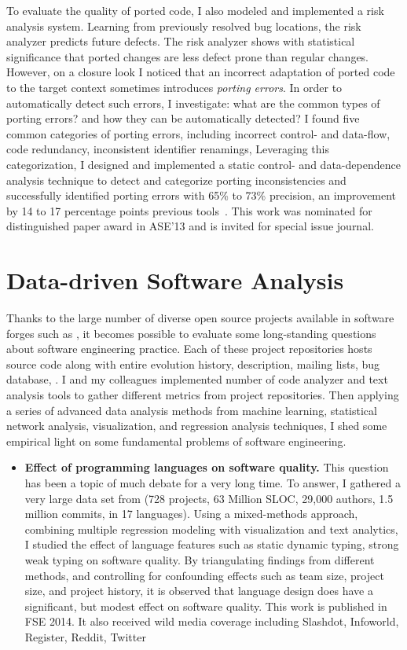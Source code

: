 \documentclass[a4paper, 11pt]{article}
\begin{document}
\begin{small}
To evaluate the quality of ported code, I also modeled and implemented a risk analysis system.
Learning from previously resolved bug locations, the risk analyzer predicts future defects. The
risk analyzer shows with statistical significance that ported changes are less defect prone
than regular changes. However, on a closure look I noticed that an incorrect adaptation of
ported code to the target context sometimes introduces {\em porting errors}. In order to
automatically detect such errors, I investigate: what are the common types of porting errors?
and how they can be automatically detected? I found five common categories of porting errors,
including incorrect control- and data-flow, code redundancy, inconsistent identifier renamings,
\etc Leveraging this categorization, I designed and implemented a static control- and
data-dependence analysis technique to detect and categorize porting inconsistencies and
successfully identified porting errors with 65\% to 73\% precision, an improvement by 14 to 17
percentage points \wrt previous tools~\cite{}. This work was nominated for distinguished paper
award in ASE'13 and is invited for special issue journal.

\section*{\large Data-driven Software Analysis}

Thanks to the large number of diverse open source projects available in software forges such as
\gh, it becomes possible to evaluate some long-standing questions about software engineering
practice. Each of these project repositories hosts source code along with entire evolution
history, description, mailing lists, bug database, \etc.  I and my colleagues implemented
number of code analyzer and text analysis tools to gather different metrics from \gh project
repositories. Then applying a series of advanced data analysis methods from machine learning,
statistical network analysis, visualization, and regression analysis techniques, I shed some
empirical light on some fundamental problems of software engineering. 

\begin{itemize}

  \item{\textbf{Effect of programming languages on software quality.}}
    This question has been a topic of much debate for a very long time. To answer, I
    gathered a very large data set from \gh (728 projects, 63 Million SLOC, 29,000 authors, 1.5
    million commits, in 17 languages). Using a mixed-methods approach, combining multiple
    regression modeling with visualization and text analytics, I studied the effect of language
    features such as static \vs dynamic typing, strong \vs weak typing on software quality. By
    triangulating findings from different methods, and controlling for confounding effects such
    as team size, project size, and project history, it is observed that language design does
    have a significant, but modest effect on software quality.  This work is published in FSE
    2014. It also received wild media coverage including Slashdot, Infoworld, Register, Reddit,
    Twitter \etc


\end{itemize}
\end{small}
\end{document}
